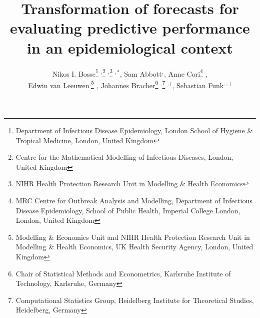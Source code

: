 \documentclass{article}
\begin{document}
\title{Transformation of forecasts for evaluating predictive performance in an epidemiological context}
  \author{Nikos I. Bosse\thanks{Department of Infectious Disease Epidemiology, London School of Hygiene \& Tropical Medicine, London, United Kingdom} $^{,}$\thanks{Centre for the Mathematical Modelling of Infectious Diseases, London, United Kingdom} $^{,}$\thanks{NIHR Health Protection Research Unit in Modelling \& Health Economics} $^{,*}$,  
  Sam Abbott\footnotemark[1] $^{,}$\footnotemark[2]$ ^{}$, 
  Anne Cori\thanks{MRC Centre for Outbreak Analysis and Modelling, Department of Infectious Disease Epidemiology, School of Public Health, Imperial College London, London, United Kingdom} $^{}$, \\
  Edwin van Leeuwen\footnotemark[1] $^{,}$\thanks{Modelling \& Economics Unit and NIHR Health Protection Research Unit in Modelling \& Health Economics, UK Health Security Agency, London, United Kingdom} $^{}$, 
  Johannes Bracher\thanks{Chair of Statistical Methods and Econometrics, Karlsruhe Institute of Technology, Karlsruhe, Germany } $^{,}$\thanks{Computational Statistics Group, Heidelberg Institute for Theoretical Studies, Heidelberg, Germany } $^{, \dagger}$, 
  Sebastian Funk\footnotemark[1] $^{, }$\footnotemark[2] $^{, }$\footnotemark[3] $ ^{, \dagger}$}
\end{document}
